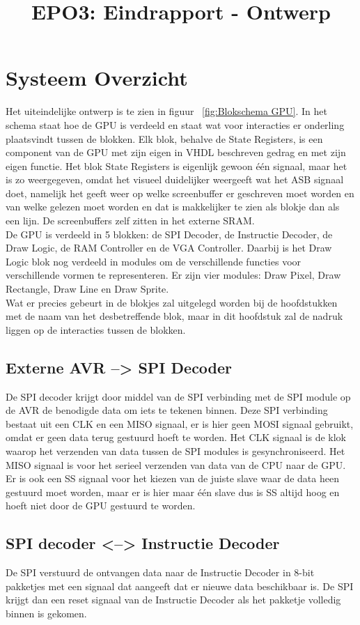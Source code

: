 \documentclass{scrartcl} %
\author{}
\title{EPO3: Eindrapport - Ontwerp}
\begin{document}
\chapter{Systeem Overzicht}
\label{ch:ontwerp}

Het uiteindelijke ontwerp is te zien in figuur ~\ref{fig:Blokschema GPU}. In het schema staat hoe de GPU is verdeeld en staat wat voor interacties er onderling plaatsvindt tussen de blokken.
Elk blok, behalve de State Registers, is een component van de GPU met zijn eigen in VHDL beschreven gedrag en met zijn eigen functie. Het blok State Registers is eigenlijk gewoon één signaal, maar het is zo weergegeven, omdat het visueel duidelijker weergeeft wat het ASB signaal doet, namelijk het geeft weer op welke screenbuffer er geschreven moet worden en van welke gelezen moet worden en dat is makkelijker te zien als blokje dan als een lijn. De screenbuffers zelf zitten in het externe SRAM. 
\\ De GPU is verdeeld in 5 blokken: de SPI Decoder, de Instructie Decoder, de Draw Logic, de RAM Controller en de VGA Controller. Daarbij is het Draw Logic blok nog verdeeld in modules om de verschillende functies voor verschillende vormen te representeren. Er zijn vier modules: Draw Pixel, Draw Rectangle, Draw Line en Draw Sprite.
\\Wat er precies gebeurt in de blokjes zal uitgelegd worden bij de hoofdstukken met de naam van het desbetreffende blok, maar in dit hoofdstuk zal de nadruk liggen op de interacties tussen de blokken.

\section{Externe AVR --> SPI Decoder}
De SPI decoder krijgt door middel van de SPI verbinding met de SPI module op de AVR de benodigde data om iets te tekenen binnen. Deze SPI verbinding bestaat uit een CLK en een MISO signaal, er is hier geen MOSI signaal gebruikt, omdat er geen data terug gestuurd hoeft te worden. Het CLK signaal is de klok waarop het verzenden van data tussen de SPI modules is gesynchroniseerd. Het MISO signaal is voor het serieel verzenden van data van de CPU naar de GPU. Er is ook een SS signaal voor het kiezen van de juiste slave waar de data heen gestuurd moet worden, maar er is hier maar één slave dus is SS altijd hoog en hoeft niet door de GPU gestuurd te worden.

\section{SPI decoder <--> Instructie Decoder}
De SPI verstuurd de ontvangen data naar de Instructie Decoder in 8-bit pakketjes met een signaal dat aangeeft dat er nieuwe data beschikbaar is. De SPI krijgt dan een reset signaal van de Instructie Decoder als het pakketje volledig binnen is gekomen.
\end{document}
